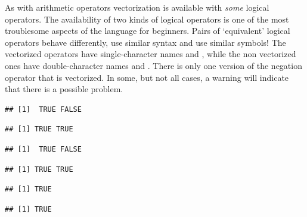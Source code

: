 \documentclass[krantz2]{krantz}\usepackage{knitr}%
\begin{document}
As with arithmetic operators vectorization is available with \emph{some} logical operators. The availability of two kinds of logical operators is one of the most troublesome aspects of the \Rlang language for beginners. Pairs of `equivalent' logical operators behave differently, use similar syntax and use similar symbols! The vectorized operators have single-character names \Roperator{\&} and \Roperator{\textbar}, while the non vectorized ones have double-character names \Roperator{\&\&} and \Roperator{\textbar\textbar}. There is only one version of the negation operator \Roperator{!} that is vectorized. In some, but not all cases, a warning will indicate that there is a possible problem.

\begin{knitrout}\footnotesize
{}\color{fgcolor}\begin{kframe}
\begin{alltt}
 \hlkwb{<-} \hlstd{(}\hlstd{,}\hlstd{)}
 \hlkwb{<-} \hlstd{(}\hlstd{,}\hlstd{)}
\end{alltt}
\begin{verbatim}
## [1]  TRUE FALSE
\end{verbatim}
\begin{alltt}
\end{alltt}
\begin{verbatim}
## [1] TRUE TRUE
\end{verbatim}
\begin{alltt}
 \hlopt{&}  
\end{alltt}
\begin{verbatim}
## [1]  TRUE FALSE
\end{verbatim}
\begin{alltt}
 \hlopt{|}  
\end{alltt}
\begin{verbatim}
## [1] TRUE TRUE
\end{verbatim}
\begin{alltt}
 \hlopt{&&}  
\end{alltt}
\begin{verbatim}
## [1] TRUE
\end{verbatim}
\begin{alltt}
 \hlopt{||}  
\end{alltt}
\begin{verbatim}
## [1] TRUE
\end{verbatim}
\end{kframe}
\end{knitrout}
\end{document}
